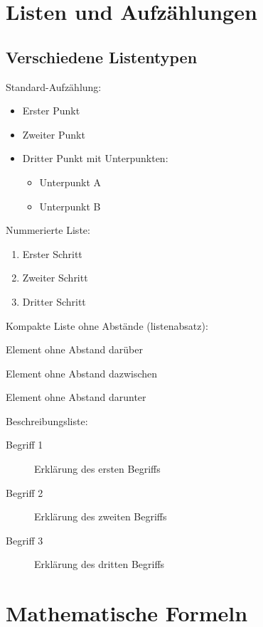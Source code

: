 \section{Listen und Aufzählungen}
\label{sec:listen_demo}

\subsection*{Verschiedene Listentypen}
\label{subsec:listentypen}

Standard-Aufzählung:
\begin{itemize}
	\item Erster Punkt
	\item Zweiter Punkt
	\item Dritter Punkt mit Unterpunkten:
	      \begin{itemize}
		      \item Unterpunkt A
		      \item Unterpunkt B
	      \end{itemize}
\end{itemize}

Nummerierte Liste:
\begin{enumerate}
	\item Erster Schritt
	\item Zweiter Schritt
	\item Dritter Schritt
\end{enumerate}

Kompakte Liste ohne Abstände (listenabsatz):
\begin{listenabsatz}
	\item Element ohne Abstand darüber
	\item Element ohne Abstand dazwischen
	\item Element ohne Abstand darunter
\end{listenabsatz}

Beschreibungsliste:
\begin{description}
	\item[Begriff 1] Erklärung des ersten Begriffs
	\item[Begriff 2] Erklärung des zweiten Begriffs
	\item[Begriff 3] Erklärung des dritten Begriffs
\end{description}

\section{Mathematische Formeln}
\label{sec:formeln_demo}

